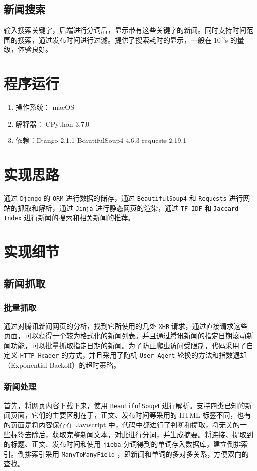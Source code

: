 \documentclass[11pt]{article}
\begin{document}
\subsection{新闻搜索}
\label{sec:org8893175}
输入搜索关键字，后端进行分词后，显示带有这些关键字的新闻。同时支持时间范围的搜索，通过发布时间进行过滤。提供了搜索耗时的显示，一般在 10\(^{\text{-2}}\)s 的量级，体验良好。

\section{程序运行}
\label{sec:org298ba66}
\begin{enumerate}
\item 操作系统： macOS
\item 解释器： CPython 3.7.0
\item 依赖：Django 2.1.1 BeautifulSoup4 4.6.3 requests 2.19.1
\end{enumerate}


\section{实现思路}
\label{sec:orgd4cf28a}
通过 \texttt{Django} 的 \texttt{ORM} 进行数据的储存，通过 \texttt{BeautifulSoup4} 和 \texttt{Requests} 进行网站的抓取和解析，通过 \texttt{Jinja} 进行静态网页的渲染，通过 \texttt{TF-IDF} 和 \texttt{Jaccard Index} 进行新闻的搜索和相关新闻的推荐。

\section{实现细节}
\label{sec:org30f7fb1}
\subsection{新闻抓取}
\label{sec:org965bf64}
\subsubsection{批量抓取}
\label{sec:org369a2ff}
通过对腾讯新闻网页的分析，找到它所使用的几处 \texttt{XHR} 请求，通过直接请求这些页面，可以获得一个较为格式化的新闻列表。并且通过腾讯新闻的指定日期滚动新闻功能，可以批量抓取指定日期的新闻。为了防止爬虫访问受限制，代码采用了自定义 \texttt{HTTP Header} 的方式，并且采用了随机 \texttt{User-Agent} 轮换的方法和指数退却（Exponential Backoff）的超时策略。
\subsubsection{新闻处理}
\label{sec:org251800d}
首先，将网页内容下载下来，使用 \texttt{BeautifulSoup4} 进行解析。支持四类已知的新闻页面，它们的主要区别在于，正文、发布时间等采用的 HTML 标签不同，也有的页面是将内容保存在 Javascript 中，代码中都进行了判断和提取，将无关的一些标签去除后，获取完整新闻文本，对此进行分词，并生成摘要。将连接、提取到的标题、正文、发布时间和使用 \texttt{jieba} 分词得到的单词存入数据库，建立倒排索引。倒排索引采用 \texttt{ManyToManyField} ，即新闻和单词的多对多关系，方便双向的查找。
\end{document}
